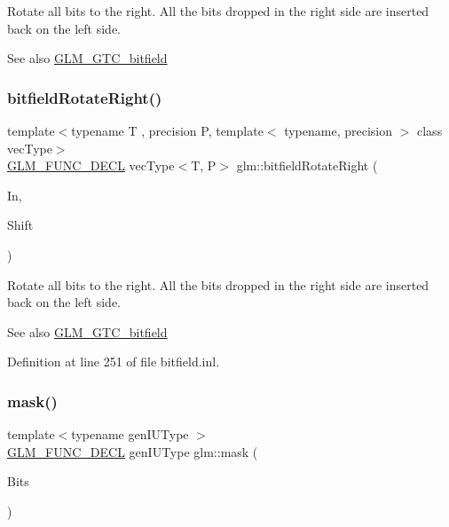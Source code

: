 Rotate all bits to the right. All the bits dropped in the right side are inserted back on the left side.

\begin{DoxySeeAlso}{See also}
\mbox{\hyperlink{group__gtc__bitfield}{G\+L\+M\+\_\+\+G\+T\+C\+\_\+bitfield}} 
\end{DoxySeeAlso}
\mbox{\label{group__gtc__bitfield_ga96b56fd2adad1eeaee9e10dfe83904ba}} 
\subsubsection{\texorpdfstring{bitfieldRotateRight()}{bitfieldRotateRight()}\hspace{0.1cm}{\footnotesize\ttfamily [2/2]}}
{\footnotesize\ttfamily template$<$typename T , precision P, template$<$ typename, precision $>$ class vec\+Type$>$ \\
\mbox{\hyperlink{setup_8hpp_ab2d052de21a70539923e9bcbf6e83a51}{G\+L\+M\+\_\+\+F\+U\+N\+C\+\_\+\+D\+E\+CL}} vec\+Type$<$T, P$>$ glm\+::bitfield\+Rotate\+Right (\begin{DoxyParamCaption}\item[{vec\+Type$<$ T, P $>$ const \&}]{In,  }\item[{int}]{Shift }\end{DoxyParamCaption})}

Rotate all bits to the right. All the bits dropped in the right side are inserted back on the left side.

\begin{DoxySeeAlso}{See also}
\mbox{\hyperlink{group__gtc__bitfield}{G\+L\+M\+\_\+\+G\+T\+C\+\_\+bitfield}} 
\end{DoxySeeAlso}


Definition at line 251 of file bitfield.\+inl.

\mbox{\label{group__gtc__bitfield_gad7eba518a0b71662114571ee76939f8a}} 
\subsubsection{\texorpdfstring{mask()}{mask()}\hspace{0.1cm}{\footnotesize\ttfamily [1/2]}}
{\footnotesize\ttfamily template$<$typename gen\+I\+U\+Type $>$ \\
\mbox{\hyperlink{setup_8hpp_ab2d052de21a70539923e9bcbf6e83a51}{G\+L\+M\+\_\+\+F\+U\+N\+C\+\_\+\+D\+E\+CL}} gen\+I\+U\+Type glm\+::mask (\begin{DoxyParamCaption}\item[{gen\+I\+U\+Type}]{Bits }\end{DoxyParamCaption})}

